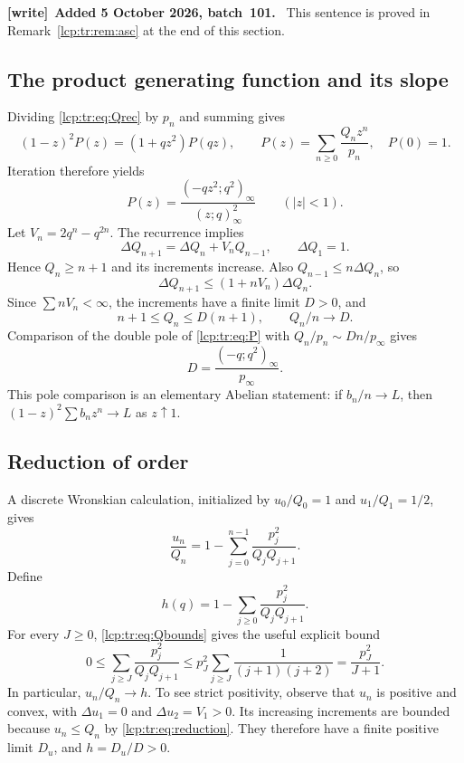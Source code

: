 \documentclass[11pt]{article}
\numberwithin{equation}{section}
\theoremstyle{definition}\newtheorem{definition}[theorem]{Definition}
\theoremstyle{remark}\newtheorem{remark}[theorem]{Remark}
\newenvironment{writenote}[1][]{\par\smallskip\begingroup\small
 \noindent\textbf{[write]}\if\relax\detokenize{#1}\relax\else~\textbf{#1.}\fi\ }%
 {\par\endgroup\smallskip}
\begin{document}
\begin{writenote}[Added 5 October 2026, batch~101]
This sentence is proved in Remark~\ref{lcp:tr:rem:asc} at the end of this
section.
\end{writenote}


\subsection{The product generating function and its slope}
Dividing \eqref{lcp:tr:eq:Qrec} by $p_n$ and summing gives
\[
 (1-z)^2P(z)=(1+qz^2)P(qz),\qquad
 P(z)=\sum_{n\ge0}\frac{Q_nz^n}{p_n},\quad P(0)=1.
\]
Iteration therefore yields
\begin{equation}\label{lcp:tr:eq:P}
 P(z)=\frac{(-qz^2;q^2)_\infty}{(z;q)_\infty^2}\qquad(|z|<1).
\end{equation}
Let $V_n=2q^n-q^{2n}$. The recurrence implies
\[
 \Delta Q_{n+1}=\Delta Q_n+V_nQ_{n-1},\qquad \Delta Q_1=1.
\]
Hence $Q_n\ge n+1$ and its increments increase. Also $Q_{n-1}\le n\Delta Q_n$, so
\[
 \Delta Q_{n+1}\le(1+nV_n)\Delta Q_n.
\]
Since $\sum nV_n<\infty$, the increments have a finite limit $D>0$, and
\begin{equation}\label{lcp:tr:eq:Qbounds}
 n+1\le Q_n\le D(n+1),\qquad Q_n/n\longrightarrow D.
\end{equation}
Comparison of the double pole of \eqref{lcp:tr:eq:P} with $Q_n/p_n\sim Dn/p_\infty$ gives
\begin{equation}\label{lcp:tr:eq:D}
 D=\frac{(-q;q^2)_\infty}{p_\infty}.
\end{equation}
This pole comparison is an elementary Abelian statement: if $b_n/n\to L$, then $(1-z)^2\sum b_nz^n\to L$ as $z\uparrow1$.

\subsection{Reduction of order}
A discrete Wronskian calculation, initialized by $u_0/Q_0=1$ and $u_1/Q_1=1/2$, gives
\begin{equation}\label{lcp:tr:eq:reduction}
 \frac{u_n}{Q_n}=1-\sum_{j=0}^{n-1}\frac{p_j^2}{Q_jQ_{j+1}}.
\end{equation}
Define
\begin{equation}\label{lcp:tr:eq:h}
 h(q)=1-\sum_{j\ge0}\frac{p_j^2}{Q_jQ_{j+1}}.
\end{equation}
For every $J\ge0$, \eqref{lcp:tr:eq:Qbounds} gives the useful explicit bound
\begin{equation}\label{lcp:tr:eq:htail}
 0\le\sum_{j\ge J}\frac{p_j^2}{Q_jQ_{j+1}}
 \le p_J^2\sum_{j\ge J}\frac{1}{(j+1)(j+2)}
 =\frac{p_J^2}{J+1}.
\end{equation}
In particular, $u_n/Q_n\to h$. To see strict positivity, observe that $u_n$ is positive and convex, with $\Delta u_1=0$ and $\Delta u_2=V_1>0$. Its increasing increments are bounded because $u_n\le Q_n$ by \eqref{lcp:tr:eq:reduction}. They therefore have a finite positive limit $D_u$, and $h=D_u/D>0$.
\end{document}
